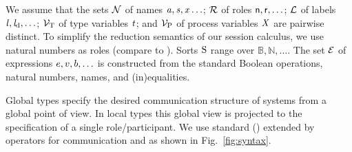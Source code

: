 We assume that the sets $ \names $ of names $ \Chan[a], \Chan, \Args \ldots $; $ \roles $ of roles $ \Role[n], \Role, \ldots $; $ \labels $ of labels $ \Label, \LabelD, \ldots $; $ \typeVars $ of type variables $ \TypeV $; and $ \procVars $ of process variables $ \ProcV $ are pairwise distinct.
To simplify the reduction semantics of our session calculus, we use natural numbers as roles (compare to \cite{hondaYoshidaCarbone16}).
Sorts $ \Sort $ range over $ \mathbb{B}, \mathbb{N}, \ldots $.
The set $ \expressions $ of expressions $ \Expr, \Expr[v], \Expr[b], \ldots $ is constructed from the standard Boolean operations, natural numbers, names, and (in)equalities.

Global types specify the desired communication structure of systems from a global point of view.
In local types this global view is projected to the specification of a single role/participant.
We use standard \MPST (\cite{HondaYoshidaCarbone08,hondaYoshidaCarbone16}) extended by operators for \unrel communication and \weakR as shown in Fig.~\ref{fig:syntax}.

